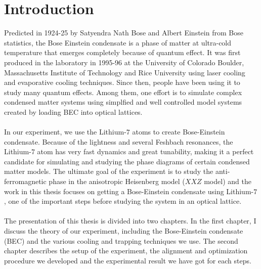 \chapter*{Introduction}

Predicted in 1924-25 by Satyendra Nath Bose and Albert Einstein from Bose statistics, the Bose Einstein condensate is a phase of matter at ultra-cold temperature that emerges completely because of quantum effect. It was first produced in the laboratory in 1995-96 at the University of Colorado Boulder, Massachusetts Institute of Technology and Rice University using laser cooling and evaporative cooling techniques. Since then, people have been using it to study many quantum effects. Among them, one effort is to simulate complex condensed matter systems using simplfied and well controlled model systems created by loading BEC into optical lattices.\\
\\
In our experiment, we use the Lithium-$7$ atoms to create Bose-Einstein condensate. Because of the lightness and several Feshbach resonances, the Lithium-$7$ atom has very fast dynamics and great tunability, making it a perfect candidate for simulating and studying the phase diagrams of certain condensed matter models. The ultimate goal of the experiment is to study the anti-ferromagnetic phase in the anisotropic Heisenberg model ($XXZ$ model) and the work in this thesis focuses on getting a Bose-Einstein condensate using Lithium-$7$, one of the important steps before studying the system in an optical lattice.\\
\\
The presentation of this thesis is divided into two chapters. In the first chapter, I discuss the theory of our experiment, including the Bose-Einstein condensate (BEC) and the various cooling and trapping techniques we use. The second chapter describes the setup of the experiment, the alignment and optimization procedure we developed and the experimental result we have got for each steps.
